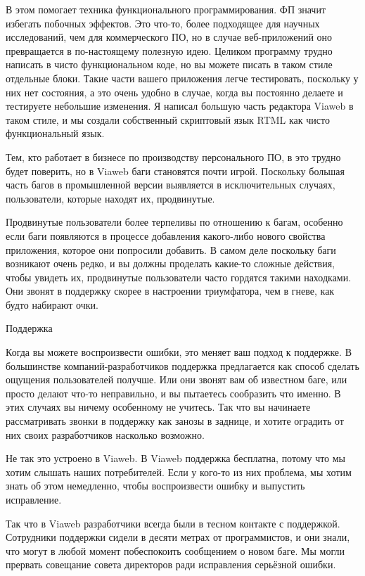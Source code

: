 \documentclass[ebook,12pt,oneside,openany]{memoir}
\begin{document}
В этом помогает техника функционального программирования. ФП значит
избегать побочных эффектов. Это что-то, более подходящее для научных
исследований, чем для коммерческого ПО, но в случае веб-приложений оно
превращается в по-настоящему полезную идею. Целиком программу трудно
написать в чисто функциональном коде, но вы можете писать в таком
стиле отдельные блоки. Такие части вашего приложения легче
тестировать, поскольку у них нет состояния, а это очень удобно в
случае, когда вы постоянно делаете и тестируете небольшие изменения. Я
написал большую часть редактора Viaweb в таком стиле, и мы создали
собственный скриптовый язык RTML как чисто функциональный язык.

Тем, кто работает в бизнесе по производству персонального ПО, в это
трудно будет поверить, но в Viaweb баги становятся почти игрой.
Поскольку большая часть багов в промышленной версии выявляется в
исключительных случаях, пользователи, которые находят их, продвинутые.

Продвинутые пользователи более терпеливы по отношению к багам,
особенно если баги появляются в процессе добавления какого-либо нового
свойства приложения, которое они попросили добавить. В самом деле
поскольку баги возникают очень редко, и вы должны проделать какие-то
сложные действия, чтобы увидеть их, продвинутые пользователи часто
гордятся такими находками. Они звонят в поддержку скорее в настроении
триумфатора, чем в гневе, как будто набирают очки.

Поддержка

Когда вы можете воспроизвести ошибки, это меняет ваш подход к
поддержке. В большинстве компаний-разработчиков поддержка предлагается
как способ сделать ощущения пользователей получше. Или они звонят вам
об известном баге, или просто делают что-то неправильно, и вы
пытаетесь сообразить что именно. В этих случаях вы ничему особенному
не учитесь. Так что вы начинаете рассматривать звонки в поддержку как
занозы в заднице, и хотите оградить от них своих разработчиков
насколько возможно.

Не так это устроено в Viaweb. В Viaweb поддержка бесплатна, потому что
мы хотим слышать наших потребителей. Если у кого-то из них проблема,
мы хотим знать об этом немедленно, чтобы воспроизвести ошибку и
выпустить исправление.

Так что в Viaweb разработчики всегда были в тесном контакте с
поддержкой. Сотрудники поддержки сидели в десяти метрах от
программистов, и они знали, что могут в любой момент побеспокоить
сообщением о новом баге. Мы могли прервать совещание совета директоров
ради исправления серьёзной ошибки.
\end{document}
